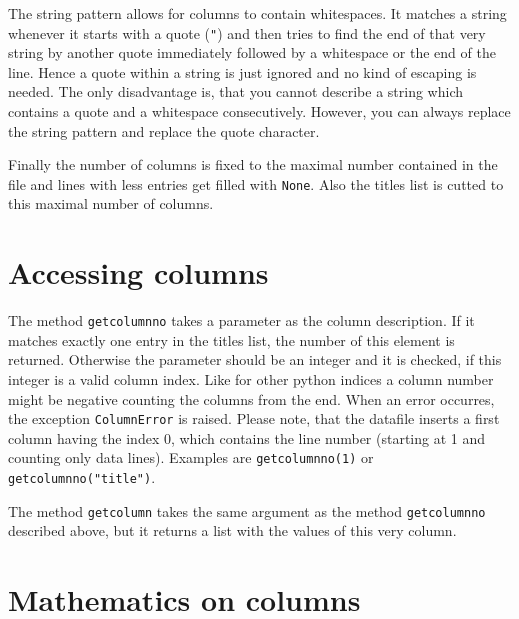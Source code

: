 The string pattern allows for columns to contain whitespaces. It
matches a string whenever it starts with a quote (\verb|"|) and then
tries to find the end of that very string by another quote immediately
followed by a whitespace or the end of the line. Hence a quote
within a string is just ignored and no kind of escaping is needed. The
only disadvantage is, that you cannot describe a string which
contains a quote and a whitespace consecutively. However, you can
always replace the string pattern and replace the quote character.

Finally the number of columns is fixed to the maximal number contained
in the file and lines with less entries get filled with \verb|None|.
Also the titles list is cutted to this maximal number of columns.

\section{Accessing columns}

The method \verb|getcolumnno| takes a parameter as the column
description. If it matches exactly one entry in the titles list, the
number of this element is returned. Otherwise the parameter should be
an integer and it is checked, if this integer is a valid column index.
Like for other python indices a column number might be negative
counting the columns from the end. When an error occurres, the
exception \verb|ColumnError| is raised. Please note, that the datafile
inserts a first column having the index 0, which contains the line
number (starting at 1 and counting only data lines). Examples are
\verb|getcolumnno(1)| or \verb|getcolumnno("title")|.

The method \verb|getcolumn| takes the same argument as the method
\verb|getcolumnno| described above, but it returns a list with the
values of this very column.

\section{Mathematics on columns}

